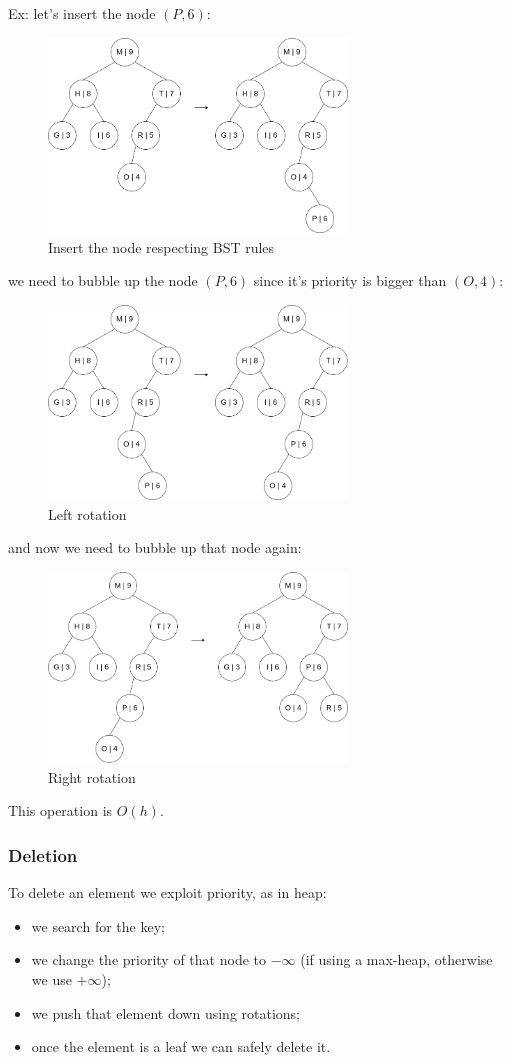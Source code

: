 Ex: let's insert the node $(P,6)$:
\begin{figure}[H]
    \centering
    \includegraphics[width=300px]{images/4_Randomized_data_structures/insert_example_1.png}
    \caption{Insert the node respecting BST rules}
\end{figure}
we need to bubble up the node $(P,6)$ since it's priority is bigger than $(O,4)$:
\begin{figure}[H]
    \centering
    \includegraphics[width=300px]{images/4_Randomized_data_structures/insert_example_2.png}
    \caption{Left rotation}
\end{figure}
and now we need to bubble up that node again:
\begin{figure}[H]
    \centering
    \includegraphics[width=300px]{images/4_Randomized_data_structures/insert_example_3.png}
    \caption{Right rotation}
\end{figure}

This operation is $O(h)$.

\subsubsection{Deletion}
To delete an element we exploit priority, as in heap:
\begin{itemize}
    \item we search for the key;
    \item we change the priority of that node to $-\infty$ (if using a max-heap, otherwise we use $+\infty$);
    \item we push that element down using rotations;
    \item once the element is a leaf we can safely delete it.
\end{itemize}

